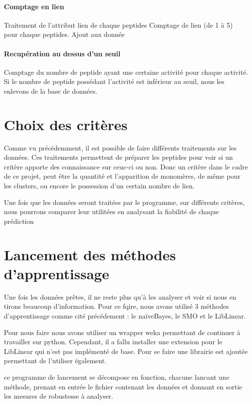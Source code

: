 \documentclass[a4paper,10pt]{report}
\begin{document}
	\paragraph{Comptage en lien}
	    Traitement de l'attribut lien de chaque peptides
	    Comptage de lien (de 1 à 5) pour chaque peptides.
	    Ajout aux donnée
	
	\paragraph{Recupération au dessus d'un seuil}
	    Comptage du nombre de peptide ayant une certaine activité pour chaque activité.
	    Si le nombre de peptide possédant l'activité est inférieur au seuil, nous les enlevons de la base de données.
   
   
    \section{Choix des critères}
	  Comme vu précédemment, il est possible de faire différents traitements sur les données.
	  Ces traitements permettent de préparer les peptides pour voir si un critère apporte des connaissance sur ceuc-ci ou non.
	  Donc un critère dans le cadre de ce projet, peut être la quantité et l'apparition de monomères, de même pour les clusters, ou encore le possession d'un certain nombre de lien. 
	  
	  Une fois que les données seront traitées par le programme, sur différents critères, nous pourrons comparer leur utilitées en analysant la fiabilité de chaque prédiction
	 
     \section{Lancement des méthodes d'apprentissage}
	  
	  Une fois les données prêtes, il ne reste plus qu'à les analyser et voir si nous en tirons beaucoup d'information.
	  Pour ce fqire, nous avons utilisé 3 méthodes d'apprentissage comme cité précédement :
	  le naïveBayes, le SMO et le LibLinear. 
	  
	  Pour nous faire nous avons utiliser un wrapper weka permettant de continuer à travailler sur python.
	  Cependant, il a fallu installer une extension pour le LibLinear qui n'est pas implémenté de base. Pour se faire une librairie est ajoutée permettant de l'utiliser également.
	  
	  ce programme de lancement se décompose en fonction, chacune lancant une méthode, prenant en entrée le fichier contenant les données et donnant en sortie les mesures de robustesse à analyser.
	  
\end{document}
